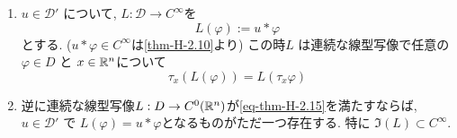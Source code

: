 \begin{tcolorbox}[mybox]
\begin{thm}\cite[Theorem 6.33]{Rud}
\label{thm-H-2.15}
\begin{enumerate}[label=$(\alph*)$]
\item \(u \in \mathcal{D}'\) について, \(L : \mathcal{D} \to C^\infty\)を
\[
L(\varphi) := u \ast \varphi 
\]
とする. ($u \ast \varphi  \in C^\infty$は\ref{thm-H-2.10}より)
この時\(L\) は連続な線型写像で任意の\(\varphi \in D\) と \(x \in \mathbb{R}^n\)について
\begin{equation}
\label{eq-thm-H-2.15}
\tau_x(L(\varphi)) = L(\tau_x \varphi) 
\end{equation}
\item 逆に連続な線型写像\(L : D \to C^0(\mathbb{R}^n)\)が\ref{eq-thm-H-2.15}を満たすならば, 
\(u \in \mathcal{D}'\) で \(L(\varphi) = u \ast \varphi\)となるものがただ一つ存在する. 
特に \(\Im(L) \subset C^\infty\).
\end{enumerate}
\end{thm}
\end{tcolorbox}


